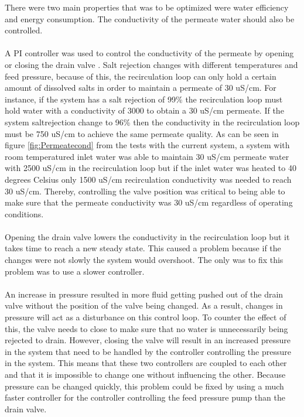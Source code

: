 There were two main properties that was to be optimized were water efficiency and energy consumption. The conductivity of the permeate water should also be controlled.\\
\\
A PI controller was used to control the conductivity of the permeate by opening or closing the drain valve . Salt rejection changes with different temperatures and feed pressure, because of this, the recirculation loop can only hold a certain amount of dissolved salts in order to maintain a permeate of 30 uS/cm. For instance, if the system has a salt rejection of 99\% the recirculation loop must hold water with a conductivity of 3000 to obtain a 30 uS/cm permeate. If the system saltrejection change to 96\% then the conductivity in the recirculation loop must be 750 uS/cm to achieve the same permeate quality. As can be seen in figure \ref{fig:Permeatecond} from the tests with the current system, a system with room temperatured inlet water was able to maintain 30 uS/cm permeate water with 2500 uS/cm in the recirculation loop but if the inlet water was heated to 40 degrees Celsius only 1500 uS/cm recirculation conductivity was needed to reach 30 uS/cm. Thereby, controlling the valve position was critical to being able to make sure that the permeate conductivity was 30 uS/cm regardless of operating conditions. \\
\\
Opening the drain valve lowers the conductivity in the recirculation loop but it takes time to reach a new steady state. This caused a problem because if the changes were not slowly the system would overshoot. The only was to fix this problem was to use a slower controller.\\
\\
An increase in pressure resulted in more fluid getting pushed out of the drain valve without the position of the valve being changed. As a result, changes in pressure will act as a disturbance on this control loop. To counter the effect of this, the valve needs to close to make sure that no water is unnecessarily being rejected to drain. However, closing the valve will result in an increased pressure in the system that need to be handled by the controller controlling the pressure in the system. This means that these two controllers are coupled to each other and that it is impossible to change one without influencing the other. Because pressure can be changed quickly, this problem could be fixed by using a much faster controller for the controller controlling the feed pressure pump than the drain valve.\\
